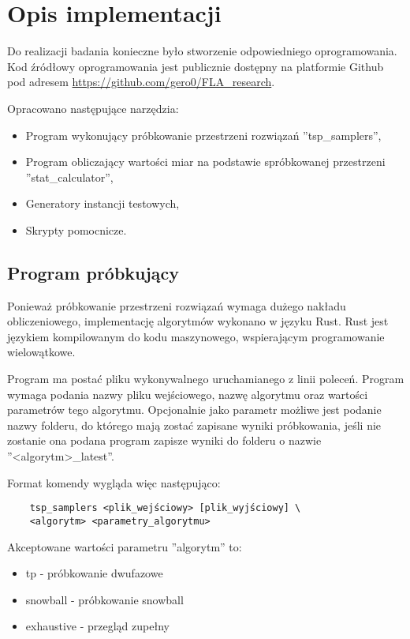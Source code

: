 \chapter{Opis implementacji}
Do realizacji badania konieczne było stworzenie odpowiedniego oprogramowania.
Kod źródłowy oprogramowania jest publicznie dostępny na platformie Github pod adresem
\url{https://github.com/gero0/FLA_research}.

Opracowano następujące narzędzia:
\begin{itemize}
    \item Program wykonujący próbkowanie przestrzeni rozwiązań ''tsp\_samplers'',
    \item Program obliczający wartości miar na podstawie spróbkowanej przestrzeni ''stat\_calculator'',
    \item Generatory instancji testowych,
    \item Skrypty pomocnicze.
\end{itemize}

\section{Program próbkujący}
Ponieważ próbkowanie przestrzeni rozwiązań wymaga dużego nakładu obliczeniowego,
implementację algorytmów wykonano w języku Rust.
Rust jest językiem kompilowanym do kodu maszynowego, wspierającym programowanie wielowątkowe.

Program ma postać pliku wykonywalnego uruchamianego z linii poleceń.
Program wymaga podania nazwy pliku wejściowego, nazwę algorytmu oraz wartości parametrów tego algorytmu.
Opcjonalnie jako parametr możliwe jest podanie nazwy folderu, do którego mają zostać zapisane wyniki próbkowania,
jeśli nie zostanie ona podana program zapisze wyniki do folderu o nazwie ''<algorytm>\_latest''.

Format komendy wygląda więc następująco:
\begin{lstlisting}
    tsp_samplers <plik_wejściowy> [plik_wyjściowy] \
    <algorytm> <parametry_algorytmu>
\end{lstlisting}


Akceptowane wartości parametru ''algorytm'' to:
\begin{itemize}
    \item tp - próbkowanie dwufazowe
    \item snowball - próbkowanie snowball
    \item exhaustive - przegląd zupełny
\end{itemize}

